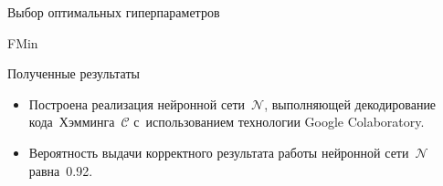 \documentclass{beamer}
\begin{document}
\begin{frame}{Выбор оптимальных гиперпараметров}
\begin{block}{FMin}

\end{block}
\end{frame}










\begin{frame}{Полученные результаты}

 \begin{itemize}
  \item {
    Построена реализация нейронной сети~$\mathcal{N}$, выполняющей декодирование кода~Хэмминга~$\mathcal{C}$ с~использованием технологии Google Colaboratory.
  }
  \item {
    Вероятность выдачи корректного результата работы нейронной сети~$\mathcal{N}$ равна~0.92.
  }
  \end{itemize}

\end{frame}
\end{document}

